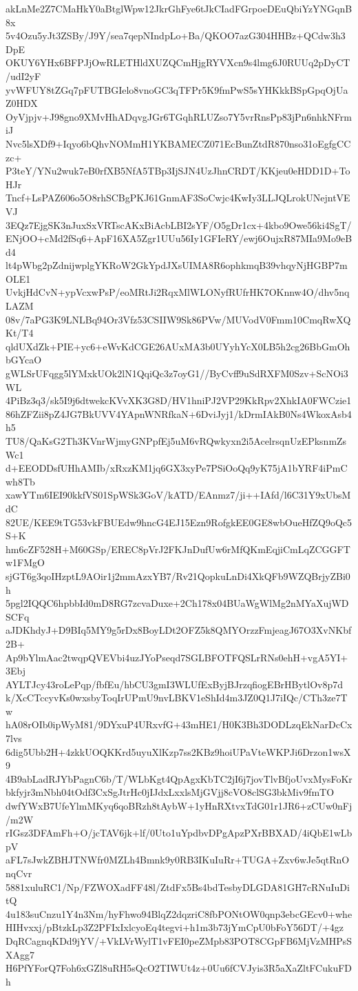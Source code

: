 akLnMe2Z7CMaHkY0aBtglWpw12JkrGhFye6tJkCIadFGrpoeDEuQbiYzYNGqnB8x
5v4Ozu5yJt3ZSBy/J9Y/sea7qepNIndpLo+Ba/QKOO7azG304HHBz+QCdw3h3DpE
OKUY6YHx6BFPJjOwRLETHldXUZQCmHjgRYVXcn9s4lmg6J0RUUq2pDyCT/udI2yF
yvWFUY8tZGq7pFUTBGIelo8vnoGC3qTFPr5K9fmPwS5sYHKkkBSpGpqOjUaZ0HDX
OyVjpjv+J98gno9XMvHhADqvgJGr6TGqhRLUZso7Y5vrRnsPp83jPn6nhkNFrmiJ
Nvc5lsXDf9+Iqyo6bQhvNOMmH1YKBAMECZ071EcBunZtdR870nso31oEgfgCCzc+
P3teY/YNu2wuk7eB0rfXB5NfA5TBp3IjSJN4UzJhnCRDT/KKjeu0eHDD1D+ToHJr
Tncf+LsPAZ606o5O8rhSCBgPKJ61GnmAF3SoCwjc4KwIy3LLJQLrokUNejntVEVJ
3EQz7EjgSK3nJuxSxVRTscAKxBiAcbLBI2sYF/O5gDr1cx+4kbo9Owe56ki4SgT/
ENjOO+cMd2fSq6+ApF16XA5Zgr1UUu56Iy1GFIeRY/ewj6OujxR87MIa9Mo9eBd4
lt4pWbg2pZdnijwplgYKRoW2GkYpdJXsUIMA8R6ophkmqB39vhqyNjHGBP7mOLE1
UvkjHdCvN+ypVcxwPsP/eoMRtJi2RqxMlWLONyfRUfrHK7OKnnw4O/dhv5nqLAZM
08v/7aPG3K9LNLBq94Or3Vfz53CSIIW9Sk86PVw/MUVodV0Fmm10CmqRwXQKt/T4
qldUXdZk+PIE+yc6+eWvKdCGE26AUxMA3b0UYyhYcX0LB5h2cg26BbGmOhbGYcaO
gWLSrUFqgg5lYMxkUOk2lN1QqiQc3z7oyG1//ByCvff9uSdRXFM0Szv+ScNOi3WL
4PiBz3q3/sk5I9j6dtwekcKVvXK3G8D/HV1hniPJ2VP29KkRpv2XhkIA0FWCzie1
86hZFZii8pZ4JG7BkUVV4YApnWNRfkaN+6DviJyj1/kDrmIAkB0Ns4WkoxAsb4h5
TU8/QaKsG2Th3KVnrWjmyGNPpfEj5uM6vRQwkyxn2i5AcelrsqnUzEPksnmZsWc1
d+EEODDsfUHhAMIb/xRxzKM1jq6GX3xyPe7PSiOoQq9yK75jA1bYRF4iPmCwh8Tb
xawYTm6IEI90kkfVS01SpWSk3GoV/kATD/EAnmz7/ji++IAfd/l6C31Y9xUbsMdC
82UE/KEE9tTG53vkFBUEdw9hncG4EJ15Ezn9RofgkEE0GE8wbOueHfZQ9oQc5S+K
hm6cZF528H+M60GSp/EREC8pVrJ2FKJnDufUw6rMfQKmEqjiCmLqZCGGFTw1FMgO
sjGT6g3qoIHzptL9AOir1j2mmAzxYB7/Rv21QopkuLnDi4XkQFb9WZQBrjyZBi0h
5pgl2IQQC6hpbbId0mD8RG7zcvaDuxe+2Ch178x04BUaWgWlMg2nMYaXujWDSCFq
aJDKhdyJ+D9BIq5MY9g5rDx8BoyLDt2OFZ5k8QMYOrzzFmjeagJ67O3XvNKbf2B+
Ap9bYlmAac2twqpQVEVbi4uzJYoPseqd7SGLBFOTFQSLrRNs0ehH+vgA5YI+3Ebj
AYLTJcy43roLePqp/fbfEu/hbCU3gmI3WLUfExByjBJrzqfiogEBrHBytlOv8p7d
k/XcCTccyvKs0wxsbyToqIrUPmU9nvLBKV1eShId4m3JZ0Q1J7iIQc/CTh3ze7Tw
hA08rOIb0ipWyM81/9DYxuP4URxvfG+43mHE1/H0K3Bh3DODLzqEkNarDcCx7lvs
6dig5Ubb2H+4zkkUOQKKrd5uyuXlKzp7ss2KBz9hoiUPaVteWKPJi6Drzon1wsX9
4B9abLadRJYbPagnC6b/T/WLbKgt4QpAgxKbTC2jI6j7jovTlvBfjoUvxMysFoKr
bkfyjr3mNbh04tOdf3CxSgJtrHc0jIJdxLxxlsMjGVjj8cVO8clSG3bkMiv9fmTO
dwfYWxB7UfeYlmMKyq6qoBRzh8tAybW+1yHnRXtvxTdG01r1JR6+zCUw0nFj/m2W
rIGsz3DFAmFh+O/jcTAV6jk+lf/0Uto1uYpdbvDPgApzPXrBBXAD/4iQbE1wLbpV
aFL7sJwkZBHJTNWfr0MZLh4Bmnk9y0RB3IKuIuRr+TUGA+Zxv6wJe5qtRnOnqCvr
5881xuluRC1/Np/FZWOXadFF48l/ZtdFx5Bs4bdTesbyDLGDA81GH7cRNuIuDitQ
4u183suCnzu1Y4n3Nm/hyFhwo94BlqZ2dqzriC8fbPONtOW0qnp3ebcGEcv0+whe
HIHvxxj/pBtzkLp3Z2PFIxIxlcyoEq4tegvi+h1m3b73jYmCpU0bFoY56DT/+4gz
DqRCagnqKDd9jYV/+VkLVrWylT1vFEI0peZMpb83POT8CGpFB6MjVzMHPsSXAgg7
H6PfYForQ7Foh6xGZl8uRH5sQcO2TIWUt4z+0Uu6fCVJyis3R5aXaZltFCukuFDh
